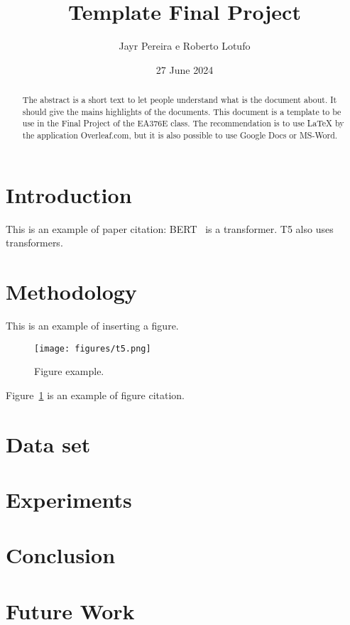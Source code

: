 \documentclass{article}
\title{Template Final Project}
\author{Jayr Pereira e Roberto Lotufo}
\date{27 June 2024}
\begin{document}
\maketitle

\begin{abstract}
    The abstract is a short text to let people understand what is the document about.
    It should give the mains highlights of the documents.
    This document is a template to be use in the Final Project of the EA376E class.
    The recommendation is to use LaTeX by the application Overleaf.com, but it is also
    possible to use Google Docs or MS-Word.
\end{abstract}

\section{Introduction}

This is an example of paper citation: BERT~ is a transformer. T5 also uses transformers.

\cite{lee2023survey}

\section{Methodology} 

This is an example of inserting a figure. 

\begin{figure}[ht]
\centering
\texttt{[image: figures/t5.png]}
\caption{\label{fig:t5}Figure example.}
\end{figure}

Figure~\ref{fig:t5} is an example of figure citation.

\section{Data set}

\section{Experiments}

\section{Conclusion}

\section{Future Work}



\end{document}
